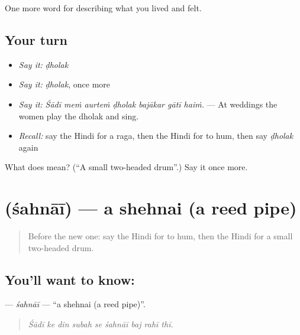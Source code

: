 \begin{grammarlens}[title={What you've built}]
One more word for describing what you lived and felt.
\end{grammarlens}

\subsection*{Your turn}
\begin{itemize}
\raggedright
  \item \emph{Say it:} \emph{ḍholak}
  \item \emph{Say it:} \emph{ḍholak}, once more
  \item \emph{Say it:} \emph{Śādī meṁ aurteṁ ḍholak bajākar gātī haiṁ.} — At weddings the women play the dholak and sing.
  \item \emph{Recall:} say the Hindi for a raga, then the Hindi for to hum, then say \emph{ḍholak} again
\end{itemize}

\begin{tcolorbox}[breakable,colback=teal!4,colframe=teal!35!black,title={Before you move on}]
What does  mean? (\textquotedblleft{}A small two-headed drum\textquotedblright{}.) Say it once more.
\end{tcolorbox}
\section[\texorpdfstring{\hi{शहनाई} (śahnāī)}{शहनाई (śahnāī)}]{ (śahnāī) — a shehnai (a reed pipe)}

\label{lesson:HI-C531-sahnai}



\begin{quote}
Before the new one: say the Hindi for to hum, then the Hindi for a small two-headed drum.
\end{quote}

\subsection*{You'll want to know: }
\textbf{} — \emph{śahnāī} — \textquotedblleft{}a shehnai (a reed pipe)\textquotedblright{}.

\begin{quote}
        
\end{quote}

\begin{quote}
\emph{Śādī ke din subah se śahnāī baj rahī thī.}
\end{quote}

